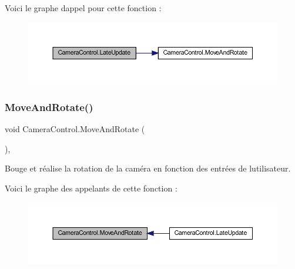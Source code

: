 Voici le graphe d\textquotesingle{}appel pour cette fonction \+:
\nopagebreak
\begin{figure}[H]
\begin{center}
\leavevmode
\includegraphics[width=350pt]{class_camera_control_a93058e0f26583cc7355f31467287d374_cgraph}
\end{center}
\end{figure}
\mbox{\label{class_camera_control_a408c4548730cdc6b96c177898f222635}} 
\subsubsection{\texorpdfstring{Move\+And\+Rotate()}{MoveAndRotate()}}
{\footnotesize\ttfamily void Camera\+Control.\+Move\+And\+Rotate (\begin{DoxyParamCaption}{ }\end{DoxyParamCaption})\hspace{0.3cm}{\ttfamily [inline]}, {\ttfamily [private]}}



Bouge et réalise la rotation de la caméra en fonction des entrées de l\textquotesingle{}utilisateur. 

Voici le graphe des appelants de cette fonction \+:
\nopagebreak
\begin{figure}[H]
\begin{center}
\leavevmode
\includegraphics[width=350pt]{class_camera_control_a408c4548730cdc6b96c177898f222635_icgraph}
\end{center}
\end{figure}
\mbox{\label{class_camera_control_ab7238445e22d5a0d5c2f620f1ad46fa2}} 
